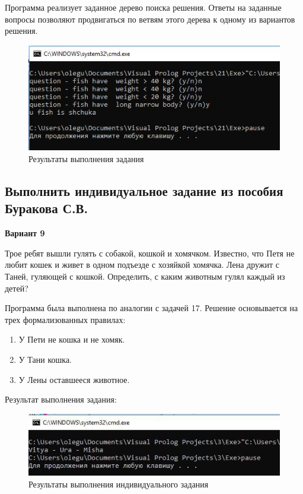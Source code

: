 \documentclass[14pt,a4paper,report]{report}
\begin{document}
Программа реализует заданное дерево поиска решения. Ответы на заданные вопросы позволяют продвигаться по ветвям этого дерева к одному из вариантов решения.



\begin{figure}[h!]
	\centering
	\includegraphics[scale = 0.9]{images/d21.png}
	\caption{Результаты выполнения задания}
\end{figure}

\clearpage
\subsection{Выполнить индивидуальное задание из пособия Буракова С.В.}

\textbf{Вариант 9}

Трое ребят вышли гулять с собакой, кошкой и хомячком. Известно, что Петя не любит кошек и живет в одном подъезде с хозяйкой хомячка. Лена дружит с Таней, гуляющей с кошкой. Определить, с каким животным гулял каждый из детей?



Программа была выполнена по аналогии с задачей 17. Решение основывается на трех формализованных правилах:

\begin{enumerate}
	\item У Пети не кошка и не хомяк.
	\item У Тани кошка.
	\item У Лены оставшееся животное.
\end{enumerate}

Результат выполнения задания:

\begin{figure}[h!]
	\centering
	\includegraphics[scale = 0.9]{images/i1.png}
	\caption{Результаты выполнения индивидуального задания}
\end{figure}
\end{document}
